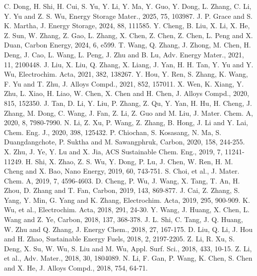 \documentclass[12pt,a4paper,twocolumn]{article} %
\newcommand{\english}[1]{\textenglish{#1}}
\begin{document}
\begin{thebibliography}{99}
 \english{C. Dong, H. Shi, H. Cui, S. Yu, Y. Li, Y. Ma, Y. Guo, Y. Dong, L. Zhang, C. Li, Y. Yu and Z. S. Wu, Energy Storage Mater., 2025, 75, 103987.}
 \english{J. P. Grace and S. K. Martha, J. Energy Storage, 2024, 88, 111585.}
 \english{Y. Cheng, B. Liu, X. Li, X. He, Z. Sun, W. Zhang, Z. Gao, L. Zhang, X. Chen, Z. Chen, Z. Chen, L. Peng and X. Duan, Carbon Energy, 2024, 6, e599.}
 \english{T. Wang, Q. Zhang, J. Zhong, M. Chen, H. Deng, J. Cao, L. Wang, L. Peng, J. Zhu and B. Lu, Adv. Energy Mater., 2021, 11, 2100448.}
 \english{J. Liu, X. Liu, Q. Zhang, X. Liang, J. Yan, H. H. Tan, Y. Yu and Y. Wu, Electrochim. Acta, 2021, 382, 138267.}
 \english{Y. Hou, Y. Ren, S. Zhang, K. Wang, F. Yu and T. Zhu, J. Alloys Compd., 2021, 852, 157011.}
 \english{X. Wen, K. Xiang, Y. Zhu, L. Xiao, H. Liao, W. Chen, X. Chen and H. Chen, J. Alloys Compd., 2020, 815, 152350.}
 \english{J. Tan, D. Li, Y. Liu, P. Zhang, Z. Qu, Y. Yan, H. Hu, H. Cheng, J. Zhang, M. Dong, C. Wang, J. Fan, Z. Li, Z. Guo and M. Liu, J. Mater. Chem. A, 2020, 8, 7980-7990.}
 \english{N. Li, Z. Xu, P. Wang, Z. Zhang, B. Hong, J. Li and Y. Lai, Chem. Eng. J., 2020, 398, 125432.}
 \english{P. Chiochan, S. Kosasang, N. Ma, S. Duangdangchote, P. Suktha and M. Sawangphruk, Carbon, 2020, 158, 244-255.}
 \english{X. Zhu, J. Ye, Y. Lu and X. Jia, ACS Sustainable Chem. Eng., 2019, 7, 11241-11249.}
 \english{H. Shi, X. Zhao, Z. S. Wu, Y. Dong, P. Lu, J. Chen, W. Ren, H. M. Cheng and X. Bao, Nano Energy, 2019, 60, 743-751.}
 \english{S. Choi, et al., J. Mater. Chem. A, 2019, 7, 4596-4603.}
 \english{D. Cheng, P. Wu, J. Wang, X. Tang, T. An, H. Zhou, D. Zhang and T. Fan, Carbon, 2019, 143, 869-877.}
 \english{J. Cai, Z. Zhang, S. Yang, Y. Min, G. Yang and K. Zhang, Electrochim. Acta, 2019, 295, 900-909.}
 \english{K. Wu, et al., Electrochim. Acta, 2018, 291, 24-30.}
 \english{Y. Wang, J. Huang, X. Chen, L. Wang and Z. Ye, Carbon, 2018, 137, 368-378.}
 \english{J. L. Shi, C. Tang, J. Q. Huang, W. Zhu and Q. Zhang, J. Energy Chem., 2018, 27, 167-175.}
 \english{D. Liu, Q. Li, J. Hou and H. Zhao, Sustainable Energy Fuels, 2018, 2, 2197-2205.}
 \english{Z. Li, R. Xu, S. Deng, X. Su, W. Wu, S. Liu and M. Wu, Appl. Surf. Sci., 2018, 433, 10-15.}
 \english{Z. Li, et al., Adv. Mater., 2018, 30, 1804089.}
 \english{N. Li, F. Gan, P. Wang, K. Chen, S. Chen and X. He, J. Alloys Compd., 2018, 754, 64-71.}

\end{thebibliography}
\end{document}
